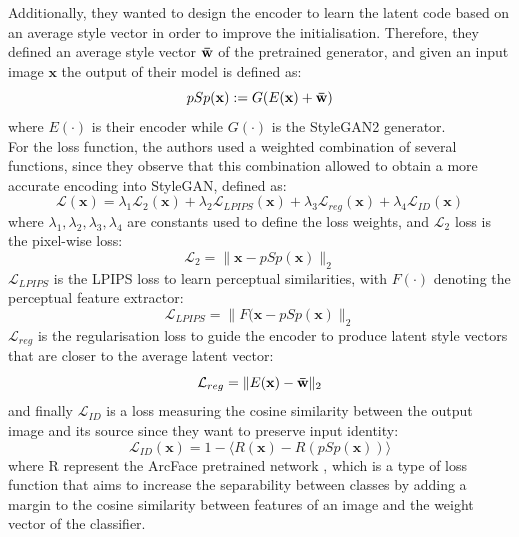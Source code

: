 \noindent Additionally, they wanted to design the encoder to learn the latent code based on an average style vector in order to improve the initialisation. Therefore, they defined an average style vector $\mathbf{\Bar{w}}$ of the pretrained generator, and given an input image $\mathbf{x}$ the output of their model is defined as:
\begin{equation}
    pSp(\mathbf{x}) := G(E(\mathbf{x}) + \mathbf{\Bar{w}})
\end{equation}
where $E(\cdot)$ is their encoder while $G(\cdot)$ is the StyleGAN2 generator.\\
For the loss function, the authors used a weighted combination of several functions, since they observe that this combination allowed to obtain a more accurate encoding into StyleGAN, defined as: 
\begin{equation}
    \label{eq:pSpTotalLoss}
    \mathcal{L}(\mathbf{x}) = \lambda_1 \mathcal{L}_2(\mathbf{x}) + \lambda_2 \mathcal{L}_{LPIPS}(\mathbf{x}) + \lambda_3\mathcal{L}_{reg}(\mathbf{x}) + \lambda_4\mathcal{L}_{ID}(\mathbf{x})
\end{equation}
where $\lambda_1,\lambda_2,\lambda_3,\lambda_4$ are constants used to define the loss weights, and $\mathcal{L}_2$ loss is the pixel-wise loss:
\begin{equation}
    \label{eq:l2Loss}
    \mathcal{L}_2 =  \| \mathbf{x} - pSp(\mathbf{x})  \|_2
\end{equation}
 $\mathcal{L}_{LPIPS}$ is the LPIPS loss to learn perceptual similarities, with $F(\cdot)$ denoting the perceptual feature extractor:
\begin{equation}
    \label{eq:lpips-loss}
    \mathcal{L}_{LPIPS} = \| F(\mathbf{x} - pSp(\mathbf{x}) \|_2
\end{equation}
$ \mathcal{L}_{reg}$ is the regularisation loss to guide the encoder to produce latent style vectors that are closer to the average latent vector:
\begin{equation}
    \label{eq:regularizationLoss-psp}
    \mathcal{L}_{reg} = \| E(\mathbf{x}) - \mathbf{\Bar{w}}\| _2
\end{equation}
and finally $ \mathcal{L}_{ID}$ is a loss measuring the cosine similarity between the output image and its source since they want to preserve input identity:
\begin{equation}
    \label{eq:identityLoss}
    \mathcal{L}_{ID}(\mathbf{x}) = 1 - \langle R(\mathbf{x}) - R(pSp(\mathbf{x}))\rangle
\end{equation}
where R represent the ArcFace pretrained network \cite{arcface2018}, which is a type of loss function that aims to increase the separability between classes by adding a margin to the cosine similarity between features of an image and the weight vector of the classifier.

